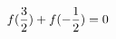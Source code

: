 \documentclass[preview]{standalone}
\begin{document}
\begin{align*}
\special{dvisvgm:raw <g id='unique000'>}f(\frac{3}{2})+f(-\frac{1}{2})=0\special{dvisvgm:raw </g>}
\end{align*}
\end{document}
